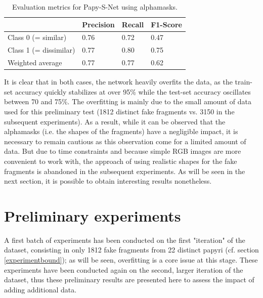\documentclass[11pt]{report}
\newcommand\xfrag{3150 }
\begin{document}
\begin{table}[h!]
\begin{tabular}{l|l|l|l|}
\cline{2-4}
                                             & Precision & Recall & F1-Score \\ \hline
\multicolumn{1}{|l|}{Class 0 (= similar)}    & 0.76      & 0.72   & 0.47     \\ \cline{1-1}
\multicolumn{1}{|l|}{Class 1 (= dissimilar)} & 0.77      & 0.80   & 0.75     \\ \hline
\multicolumn{1}{|l|}{Weighted average}       & 0.77      & 0.77   & 0.62     \\ \hline
\end{tabular}
\caption{Evaluation metrics for Papy-S-Net using alphamasks.}
\label{tab:tabpapyalpha}
\end{table}


It is clear that in both cases, the network heavily overfits the data, as the train-set accuracy quickly stabilizes at over 95\% while the test-set accuracy oscillates between 70 and 75\%. The overfitting is mainly due to the small amount of data used for this preliminary test (1812 distinct fake fragments vs. \xfrag in the subsequent experiments). As a result, while it can be observed that the alphamasks (i.e. the shapes of the fragments) have a negligible impact, it is necessary to remain cautious as this observation come for a limited amount of data.\newline
But due to time constraints and because simple RGB images are more convenient to work with, the approach of using realistic shapes for the fake fragments is abandoned in the subsequent experiments. As will be seen in the next section, it is possible to obtain interesting results nonetheless.\newline

\section{Preliminary experiments}

A first batch of experiments has been conducted on the first "iteration" of the dataset, consisting in only 1812 fake fragments from 22 distinct papyri (cf. section \ref{experimentbound}); as will be seen, overfitting is a core issue at this stage. These experiments have been conducted again on the second, larger iteration of the dataset, thus these preliminary results are presented here to assess the impact of adding additional data.\newline
\end{document}

